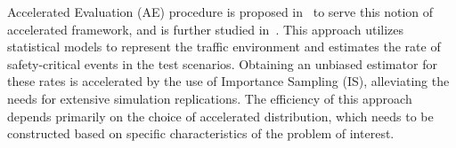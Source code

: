 \documentclass[letterpaper, 10 pt, journal]{IEEEtran}  %
\begin{document}


Accelerated Evaluation (AE) procedure is proposed in~\cite{zhao2017accelerated} to serve this notion of accelerated framework, and is further studied in~\cite{zhao2017acceleratedb,huang2017accelerated,huang2017acceleratedb}. This approach utilizes statistical models to represent the traffic environment and estimates the rate of safety-critical events in the test scenarios. Obtaining an unbiased estimator for these rates is accelerated by the use of Importance Sampling (IS), alleviating the needs for extensive simulation replications. The efficiency of this approach depends primarily on the choice of accelerated distribution, which needs to be constructed based on specific characteristics of the problem of interest.
\end{document}
